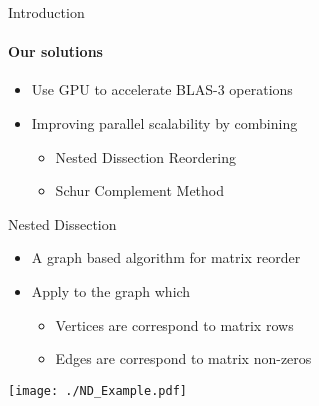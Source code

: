 \documentclass[final]{beamer}
\newlength{\onecolwid}
\begin{document}
\begin{frame}[t]
\begin{columns}[t]
\begin{column}{\onecolwid}
\begin{block}{Introduction}
          \paragraph{\textbf{Our solutions}}
          \begin{itemize}
            \item Use GPU to accelerate BLAS-3 operations
            \item Improving parallel scalability by combining
            \begin{itemize}
              \item Nested Dissection Reordering
              \item Schur Complement Method
            \end{itemize}
          \end{itemize}
        \end{block}

        \begin{block}{Nested Dissection}
          \begin{itemize}
            \item A graph based algorithm for matrix reorder
            \item Apply to the graph which
            \begin{itemize}
              \item Vertices are correspond to matrix rows
              \item Edges are correspond to matrix non-zeros
            \end{itemize}
          \end{itemize}
          \texttt{[image: ./ND\_Example.pdf]}
        \end{block}


\end{column}
\end{columns}
\end{frame}
\end{document}
